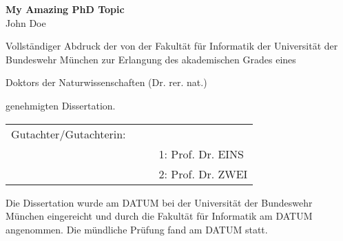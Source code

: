 \thispagestyle{empty}
{
  \parindent 0pt
  \vspace*{1.7cm}
  \begin{centering}
    {\Large \bf My Amazing PhD Topic}
    \\[40pt]
    {\centering John Doe}
    \\[35pt]
  \end{centering}

  {\justify
    Vollständiger Abdruck der von der Fakultät für Informatik der Universität der Bundeswehr München zur Erlangung des akademischen Grades eines \\[25pt]
}

  \begin{centering}
  Doktors der Naturwissenschaften (Dr. rer. nat.)\\
  \end{centering}

  \vspace*{25pt}

  \begin{flushleft}
    genehmigten Dissertation.
  \end{flushleft}

  \vspace*{80pt}

  \begin{table}[H]
\centering
\begin{tabular}{p{4.5cm}p{7.5cm}}
 \hspace{-1em} Gutachter/Gutachterin:~~~~ &                                  \\
                        & 1: Prof. Dr. EINS          \\
                        & 2: Prof. Dr. ZWEI
\end{tabular}
\end{table}

  \vspace*{60pt}

  Die Dissertation wurde am DATUM bei der Universität der Bundeswehr München eingereicht und durch die Fakultät für Informatik am DATUM angenommen. Die mündliche Prüfung fand am DATUM statt.
}
